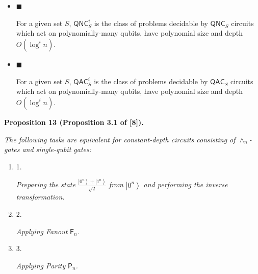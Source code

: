 \begin{itemize}


\item[] 
$\blacksquare$ 


For a given set $S$, ${\mathsf{QNC}}_{S}^{i}$ is the class of problems decidable by ${\mathsf{QNC}}_{S}$ circuits which act on polynomially-many qubits, have polynomial size and depth $O(\log^{i}n)$.\par





\item[] 
$\blacksquare$ 


For a given set $S$, ${\mathsf{QAC}}_{S}^{i}$ is the class of problems decidable by ${\mathsf{QAC}}_{S}$ circuits which act on polynomially-many qubits, have polynomial size and depth $O(\log^{i}n)$.\par





\end{itemize}





\par\medskip\noindent\textbf{
\textbf{Proposition 13}\textbf{ }(Proposition 3.1 of [8])\textbf{.}
}\par



\emph{The following tasks are equivalent for constant-depth circuits consisting of $\wedge_{n}$-gates and single-qubit gates:}\par


\begin{enumerate}


\item[] 
1. 


\emph{Preparing the state }$\frac{\left|0^{n}\right\rangle+\left|1^{n}\right\rangle}{\sqrt{2}}$\emph{ from }$\left|0^{n}\right\rangle$\emph{ and performing the inverse transformation.}\par





\item[] 
2. 


\emph{Applying Fanout }$\mathsf{F}_{n}$\emph{.}\par





\item[] 
3. 


\emph{Applying Parity }$\mathsf{P}_{n}$\emph{.}\par





\end{enumerate}


